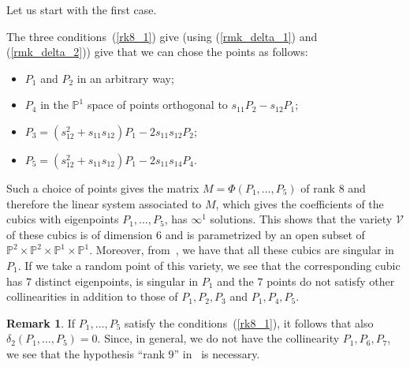 \documentclass{amsart}
\theoremstyle{plain}
\theoremstyle{definition}
\newtheorem{rmk}[lemma]{Remark}
\begin{document}
Let us start with the first case.

The three conditions~(\ref{rk8_1}) give (using (\ref{rmk_delta_1})
and (\ref{rmk_delta_2})) give that we can chose the points as follows:
\begin{itemize}
\item $P_1$ and $P_2$ in an arbitrary way;
\item $P_4$ in the $\mathbb{P}^1$
space of points orthogonal to $s_{11}P_2-s_{12}P_1$;
\item $P_3 = (s_{12}^2+s_{11}s_{12})P_1-2s_{11}s_{12}P_2$;
\item $P_5 = (s_{12}^2+s_{11}s_{12})P_1-2s_{11}s_{14}P_4$.
\end{itemize}

Such a choice
of points gives the matrix $M = \Phi(P_1, \dots, P_5)$ of rank $8$ and
therefore the linear system associated to $M$, which gives the
coefficients of the cubics with eigenpoints $P_1, \dots, P_5$, has $\infty^1$
solutions. This shows that the variety $\mathcal{V}$ of these cubics is
of dimension $6$ and is parametrized by an open subset of
$\mathbb{P}^2 \times \mathbb{P}^2\times \mathbb{P}^1\times \mathbb{P}^1$.
Moreover, from~, we have that all these cubics
are singular in $P_1$.
If we take a random point of this variety, we see that the corresponding
cubic has $7$ distinct eigenpoints, is singular in $P_1$ and the $7$ points
do not satisfy other collinearities in addition to those of $P_1, P_2, P_3$
and $P_1, P_4, P_5$.

\begin{rmk}
If $P_1, \dots, P_5$ satisfy the conditions~(\ref{rk8_1}),
it follows that also $\delta_2(P_1, \dots, P_5) = 0$. Since,
in general, we do not have the collinearity $P_1, P_6, P_7$,
we see that the hypothesis ``rank $9$''
in~ is necessary.
\end{rmk}
\end{document}
